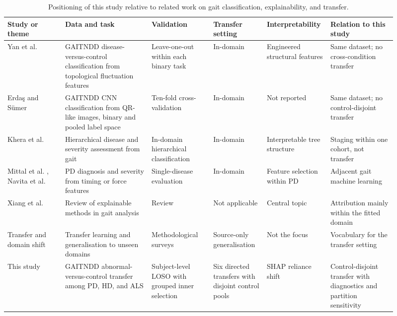 \documentclass[conference]{IEEEtran}
\begin{document}
\begin{table}[t]
\caption{Positioning of this study relative to related work on gait classification, explainability, and transfer.}
\label{tab:prior-work}
\centering
\footnotesize
\begingroup
\setlength{\tabcolsep}{3pt}
\renewcommand{\arraystretch}{1.08}
\begin{tabular}{>{\raggedright\arraybackslash}p{0.14\linewidth}>{\raggedright\arraybackslash}p{0.21\linewidth}>{\raggedright\arraybackslash}p{0.15\linewidth}>{\raggedright\arraybackslash}p{0.13\linewidth}>{\raggedright\arraybackslash}p{0.12\linewidth}>{\raggedright\arraybackslash}p{0.16\linewidth}}
\toprule
Study or theme & Data and task & Validation & Transfer setting & Interpretability & Relation to this study \\
\midrule
Yan et al. \cite{yan2020tma} & GAITNDD disease-versus-control classification from topological fluctuation features & Leave-one-out within each binary task & In-domain & Engineered structural features & Same dataset; no cross-condition transfer \\
Erda\c{s} and S\"umer \cite{erdas2024qr} & GAITNDD CNN classification from QR-like images, binary and pooled label space & Ten-fold cross-validation & In-domain & Not reported & Same dataset; no control-disjoint transfer \\
Khera et al. \cite{khera2025severity} & Hierarchical disease and severity assessment from gait & In-domain hierarchical classification & In-domain & Interpretable tree structure & Staging within one cohort, not transfer \\
Mittal et al. \cite{mittal2025pd}, Navita et al. \cite{navita2025force} & PD diagnosis and severity from timing or force features & Single-disease evaluation & In-domain & Feature selection within PD & Adjacent gait machine learning \\
Xiang et al. \cite{xiang2025xai} & Review of explainable methods in gait analysis & Review & Not applicable & Central topic & Attribution mainly within the fitted domain \\
Transfer and domain shift \cite{pan2010transfer,zhou2021dgsurvey} & Transfer learning and generalisation to unseen domains & Methodological surveys & Source-only generalisation & Not the focus & Vocabulary for the transfer setting \\
This study & GAITNDD abnormal-versus-control transfer among PD, HD, and ALS & Subject-level LOSO with grouped inner selection & Six directed transfers with disjoint control pools & SHAP reliance shift & Control-disjoint transfer with diagnostics and partition sensitivity \\
\bottomrule
\end{tabular}
\endgroup
\end{table}
\end{document}
